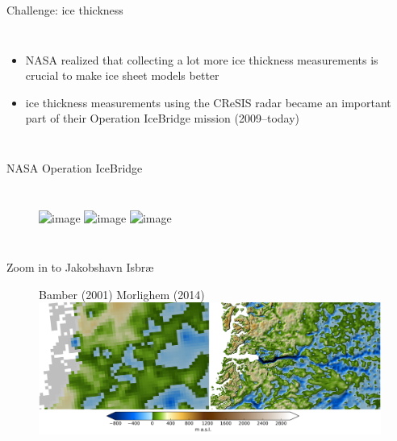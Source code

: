 \documentclass[hide notes,intlimits]{beamer}
\begin{document}
\begin{frame}{Challenge: ice thickness}
\begin{columns}
    \column[c]{10cm}
    \begin{itemize}
    \item NASA realized that collecting a lot more ice thickness measurements is crucial to make ice sheet models better
    \item ice thickness measurements using the CReSIS radar became an important part of their Operation IceBridge mission (2009--today)
    \end{itemize}
  \end{columns}
\end{frame}


\begin{frame}{NASA Operation IceBridge}
\vspace{-0.74em}
  \begin{columns}
    \column[c]{2.5cm}
    \column[c]{6cm}
    \begin{figure}
      \includegraphics<1>[height=8cm]{greenland-bed-old}
      \includegraphics<2>[height=8cm]{greenland-bed-old-oib}
      \includegraphics<3>[height=8cm]{greenland-bed-mcb}
    \end{figure}
  \end{columns}
\end{frame}

\begin{frame}{Zoom in to Jakobshavn Isbr{\ae}}
  \begin{figure}
    \small{Bamber (2001) \hspace{5em} Morlighem (2014)}
    \includegraphics[width=12cm]{jako_bed}
 \end{figure}
\end{frame}
\end{document}
